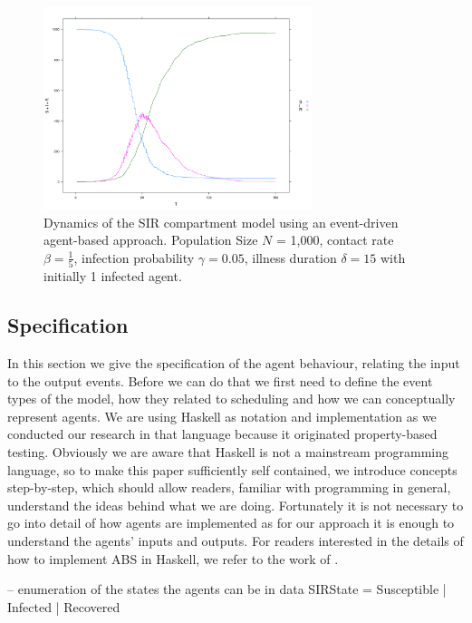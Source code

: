 \begin{figure}
	\centering
	\includegraphics[width=0.7\textwidth, angle=0]{./fig/sir_eventdriven.png}
	\caption{Dynamics of the SIR compartment model using an event-driven agent-based approach. Population Size $N$ = 1,000, contact rate $\beta =  \frac{1}{5}$, infection probability $\gamma = 0.05$, illness duration $\delta = 15$ with initially 1 infected agent.}
	\label{fig:sir_sd_dynamics}
\end{figure}

\subsection{Specification}
In this section we give the specification of the agent behaviour, relating the input to the output events. Before we can do that we first need to define the event types of the model, how they related to scheduling and how we can conceptually represent agents. We are using Haskell as notation and implementation as we conducted our research in that language because it originated property-based testing. Obviously we are aware that Haskell is not a mainstream programming language, so to make this paper sufficiently self contained, we introduce concepts step-by-step, which should allow readers, familiar with programming in general, understand the ideas behind what we are doing. Fortunately it is not necessary to go into detail of how agents are implemented as for our approach it is enough to understand the agents' inputs and outputs. For readers interested in the details of how to implement ABS in Haskell, we refer to the work of \cite{thaler_pure_2018}. 

\begin{HaskellCode}
-- enumeration of the states the agents can be in
data SIRState = Susceptible | Infected | Recovered
\end{HaskellCode}

